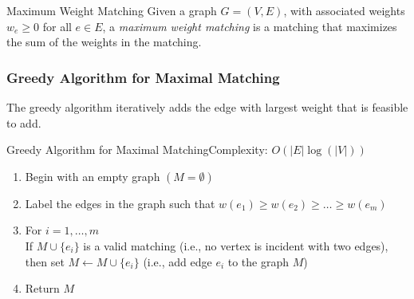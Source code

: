 \begin{definition}{Maximum Weight Matching}{}
Given a graph $G = (V,E)$, with associated weights $w_e\geq 0$ for all $e \in E$, a \emph{maximum weight matching} is a matching that maximizes the sum of the weights in the matching.
\end{definition}







%
%
\subsubsection{Greedy Algorithm for Maximal Matching}
The greedy algorithm iteratively adds the edge with largest weight that is feasible to add.  
\begin{general}{Greedy Algorithm for Maximal Matching}{Complexity: $O(|E|\log(|V|))$}
\label{alg:greedy-matching}
\begin{enumerate}
\item Begin with an empty graph $(M = \emptyset)$
\item Label the edges in the graph such that $w(e_1) \geq w(e_2) \geq \dots \geq w(e_m)$
\item For $i=1, \dots, m$\\
\indent  If $M \cup\{e_i\}$ is a valid matching (i.e., no vertex is incident with two edges), then set $M \leftarrow M \cup \{e_i\}$ (i.e., add edge $e_i$ to the graph $M$)
\item Return $M$
\end{enumerate}
\end{general}

